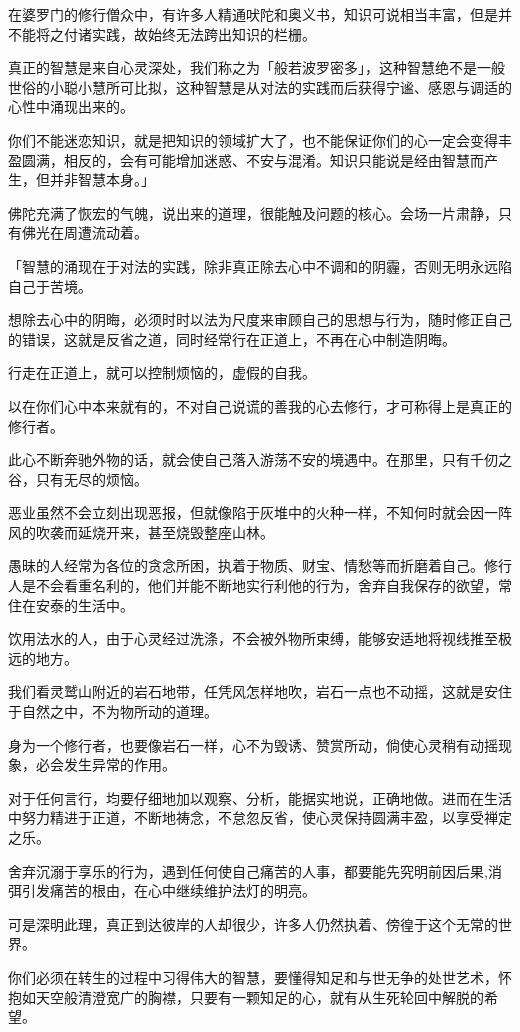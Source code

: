 \documentclass[twoside,openany]{book}
\begin{document}
在婆罗门的修行僧众中，有许多人精通吠陀和奥义书，知识可说相当丰富，但是并不能将之付诸实践，故始终无法跨出知识的栏栅。

真正的智慧是来自心灵深处，我们称之为「般若波罗密多」，这种智慧绝不是一般世俗的小聪小慧所可比拟，这种智慧是从对法的实践而后获得宁谧、感恩与调适的心性中涌现出来的。

你们不能迷恋知识，就是把知识的领域扩大了，也不能保证你们的心一定会变得丰盈圆满，相反的，会有可能增加迷惑、不安与混淆。知识只能说是经由智慧而产生，但并非智慧本身。」

佛陀充满了恢宏的气魄，说出来的道理，很能触及问题的核心。会场一片肃静，只有佛光在周遭流动着。

「智慧的涌现在于对法的实践，除非真正除去心中不调和的阴霾，否则无明永远陷自己于苦境。

想除去心中的阴晦，必须时时以法为尺度来审顾自己的思想与行为，随时修正自己的错误，这就是反省之道，同时经常行在正道上，不再在心中制造阴晦。

行走在正道上，就可以控制烦恼的，虚假的自我。

以在你们心中本来就有的，不对自己说谎的善我的心去修行，才可称得上是真正的修行者。

此心不断奔驰外物的话，就会使自己落入游荡不安的境遇中。在那里，只有千仞之谷，只有无尽的烦恼。

恶业虽然不会立刻出现恶报，但就像陷于灰堆中的火种一样，不知何时就会因一阵风的吹袭而延烧开来，甚至烧毁整座山林。

愚昧的人经常为各位的贪念所困，执着于物质、财宝、情愁等而折磨着自己。修行人是不会看重名利的，他们并能不断地实行利他的行为，舍弃自我保存的欲望，常住在安泰的生活中。

饮用法水的人，由于心灵经过洗涤，不会被外物所束缚，能够安适地将视线推至极远的地方。

我们看灵鹫山附近的岩石地带，任凭风怎样地吹，岩石一点也不动摇，这就是安住于自然之中，不为物所动的道理。

身为一个修行者，也要像岩石一样，心不为毁诱、赞赏所动，倘使心灵稍有动摇现象，必会发生异常的作用。

对于任何言行，均要仔细地加以观察、分析，能据实地说，正确地做。进而在生活中努力精进于正道，不断地祷念，不怠忽反省，使心灵保持圆满丰盈，以享受禅定之乐。

舍弃沉溺于享乐的行为，遇到任何使自己痛苦的人事，都要能先究明前因后果,消弭引发痛苦的根由，在心中继续维护法灯的明亮。

可是深明此理，真正到达彼岸的人却很少，许多人仍然执着、傍徨于这个无常的世界。

你们必须在转生的过程中习得伟大的智慧，要懂得知足和与世无争的处世艺术，怀抱如天空般清澄宽广的胸襟，只要有一颗知足的心，就有从生死轮回中解脱的希望。
\end{document}
